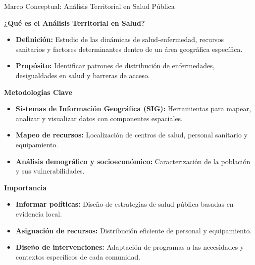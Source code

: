 \documentclass[aspectratio=169]{beamer}
\begin{document}
\begin{frame}{Marco Conceptual: Análisis Territorial en Salud Pública}


\textbf{¿Qué es el Análisis Territorial en Salud?}
\begin{itemize}
  \item \textbf{Definición:} Estudio de las dinámicas de salud-enfermedad, recursos sanitarios y factores determinantes dentro de un área geográfica específica.
  \item \textbf{Propósito:} Identificar patrones de distribución de enfermedades, desigualdades en salud y barreras de acceso.
\end{itemize}
\textbf{Metodologías Clave}
\begin{itemize}
  \item \textbf{Sistemas de Información Geográfica (SIG):} Herramientas para mapear, analizar y visualizar datos con componentes espaciales.
  \item \textbf{Mapeo de recursos:} Localización de centros de salud, personal sanitario y equipamiento.
  \item \textbf{Análisis demográfico y socioeconómico:} Caracterización de la población y sus vulnerabilidades.
\end{itemize}
\textbf{Importancia}
\begin{itemize}
  \item \textbf{Informar políticas:} Diseño de estrategias de salud pública basadas en evidencia local.
  \item \textbf{Asignación de recursos:} Distribución eficiente de personal y equipamiento.
  \item \textbf{Diseño de intervenciones:} Adaptación de programas a las necesidades y contextos específicos de cada comunidad.
\end{itemize}
\end{frame}
\end{document}
